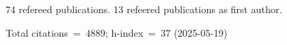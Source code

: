 74 refereed publications. 13 refeered publications as first author.

Total citations~=~4889; h-index~=~37 (2025-05-19)